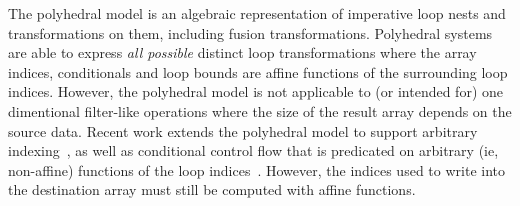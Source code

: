 The polyhedral model is an algebraic representation of imperative loop nests and transformations on them, including fusion transformations. Polyhedral systems \cite{pouchet2011polyhedral} are able to express \emph{all possible} distinct loop transformations where the array indices, conditionals and loop bounds are affine functions of the surrounding loop indices. However, the polyhedral model is not applicable to (or intended for) one dimentional filter-like operations where the size of the result array depends on the source data. Recent work extends the polyhedral model to support arbitrary indexing~\cite{venkat2014polyhedral}, as well as conditional control flow that is predicated on arbitrary (ie, non-affine) functions of the loop indices~\cite{benabderrahmane2010polyhedral}. However, the indices used to write into the destination array must still be computed with affine functions.


